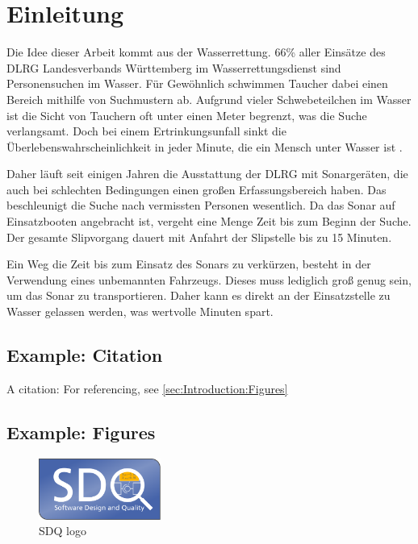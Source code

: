 
\chapter{Einleitung}
\label{ch:Introduction}

Die Idee dieser Arbeit kommt aus der Wasserrettung. 66\% aller Einsätze des DLRG Landesverbands Württemberg im Wasserrettungsdienst sind Personensuchen im Wasser\cite{dlrgwuerttemberg2017}. Für Gewöhnlich schwimmen Taucher dabei einen Bereich mithilfe von Suchmustern ab. Aufgrund vieler Schwebeteilchen im Wasser ist die Sicht von Tauchern oft unter einen Meter begrenzt, was die Suche verlangsamt. Doch bei einem Ertrinkungsunfall sinkt die Überlebenswahrscheinlichkeit in jeder Minute, die ein Mensch unter Wasser ist \cite{teising2009neonatologische, roeggla2001}.

Daher läuft seit einigen Jahren die Ausstattung der DLRG mit Sonargeräten, die auch bei schlechten Bedingungen einen großen Erfassungsbereich haben. Das beschleunigt die Suche nach vermissten Personen wesentlich. Da das Sonar auf Einsatzbooten angebracht ist, vergeht eine Menge Zeit bis zum Beginn der Suche. Der gesamte Slipvorgang dauert mit Anfahrt der Slipstelle bis zu 15 Minuten.

Ein Weg die Zeit bis zum Einsatz des Sonars zu verkürzen, besteht in der Verwendung eines unbemannten Fahrzeugs. Dieses muss lediglich groß genug sein, um das Sonar zu transportieren. Daher kann es direkt an der Einsatzstelle zu Wasser gelassen werden, was wertvolle Minuten spart.

\section{Example: Citation}
\label{sec:Introduction:Citation}
A citation: \cite{becker2008a} For referencing, see \autoref{sec:Introduction:Figures}

\section{Example: Figures}
\label{sec:Introduction:Figures}
\begin{figure}[h]
\centering
\includegraphics[width=4cm]{logos/sdqlogo}
\caption{SDQ logo}
\label{fig:sdqlogo}
\end{figure}

